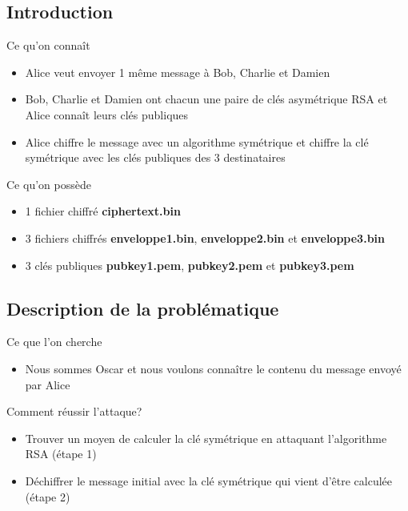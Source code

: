 \documentclass{beamer}
\begin{document}
	\subsection{Introduction}

	\begin{frame}
	\begin{block}{Ce qu'on connaît}
		\begin{itemize}
			\item Alice veut envoyer 1 même message à Bob, Charlie et Damien
			\item Bob, Charlie et Damien ont chacun une paire de clés asymétrique RSA et Alice connaît leurs clés publiques
			\item Alice chiffre le message avec un algorithme symétrique et chiffre la clé symétrique avec les clés publiques des 3 destinataires
		\end{itemize}
	\end{block}

	\begin{block}{Ce qu'on possède}
		\begin{itemize}
			\item 1 fichier chiffré \textbf{ciphertext.bin}
			\item 3 fichiers chiffrés \textbf{enveloppe1.bin}, \textbf{enveloppe2.bin} et \textbf{enveloppe3.bin}
			\item 3 clés publiques \textbf{pubkey1.pem}, \textbf{pubkey2.pem} et \textbf{pubkey3.pem}
		\end{itemize}
	\end{block}

    \end{frame}

	\subsection{Description de la problématique}

	\begin{frame}
	\begin{block}{Ce que l'on cherche}
		\begin{itemize}
		\item Nous sommes Oscar et nous voulons connaître le contenu du message envoyé par Alice
		\end{itemize}
	\end{block}
	\begin{block}{Comment réussir l'attaque?}
		\begin{itemize}
		\item Trouver un moyen de calculer la clé symétrique en attaquant l'algorithme RSA (étape 1)
		\item Déchiffrer le message initial avec la clé symétrique qui vient d'être calculée (étape 2)
		\end{itemize}
	\end{block}
    \end{frame}
\end{document}
